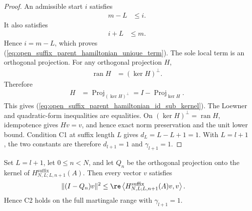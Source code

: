 \begin{proof}
    \leanok
    An admissible start $i$ satisfies
    \begin{align}
        m-L
         & \leq i.
    \end{align}
    It also satisfies
    \begin{align}
        i+L
         & \leq m.
    \end{align}
    Hence $i=m-L$, which proves
    (\ref{eq:open_suffix_parent_hamiltonian_unique_term}). The sole
    local term is an orthogonal projection. For any orthogonal projection $H$,
    \begin{align}
        \operatorname{ran}H
         & =(\ker H)^\perp.
    \end{align}
    Therefore
    \begin{align}
        H
         & =\operatorname{Proj}_{(\ker H)^\perp}
        =I-\operatorname{Proj}_{\ker H}.
    \end{align}
    This gives (\ref{eq:open_suffix_parent_hamiltonian_id_sub_kernel}).
    The Loewner and quadratic-form inequalities are equalities. On
    $(\ker H)^\perp=\operatorname{ran}H$, idempotence gives $Hv=v$, and hence
    exact norm preservation and the unit lower bound. Condition C1 at suffix
    length $L$ gives $d_L=L-L+1=1$. With $L=l+1$, the two constants are therefore
    $d_{l+1}=1$ and $\gamma_{l+1}=1$.
\end{proof}

\begin{lemma}
    \label{thm:open_suffix_parent_hamiltonian_c2_full_range}
    \leanok
    Set $L=l+1$, let $0\leq n<N$, and let $Q_n$ be the orthogonal projection
    onto the kernel of
    $H^{\mathrm{suffix}}_{N,L;L,n+1}(A)$.  Then every vector $v$ satisfies
    \begin{align}
        \lVert (I-Q_n)v\rVert^2
         & \leq
        \re\left\langle H^{\mathrm{suffix}}_{N,L;L,n+1}(A)v,v\right\rangle.
        \label{eq:open_suffix_parent_hamiltonian_c2_full_range}
    \end{align}
    Hence C2 holds on the full martingale range with $\gamma_{l+1}=1$.
\end{lemma}

